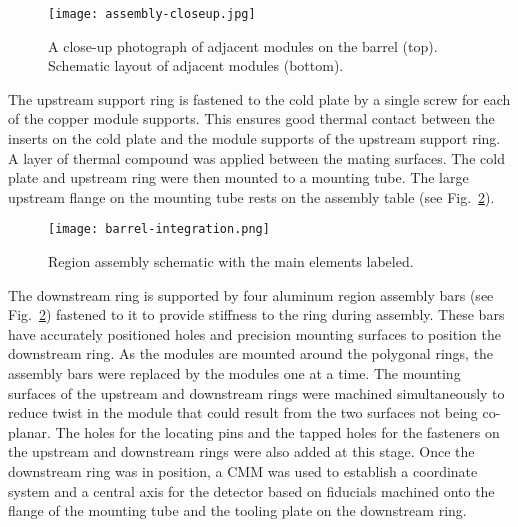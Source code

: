 \begin{figure}[h] 
\centering 
\texttt{[image: assembly-closeup.jpg]}
\caption{A close-up photograph of adjacent modules on the barrel (top). Schematic layout of adjacent modules
  (bottom).}
\label{fig:assembly-closeup}
\end{figure}

The upstream support ring is fastened to the cold plate by a single screw for each of the copper module supports.
This ensures good thermal contact between the inserts on the cold plate and the module supports of the upstream
support ring. A layer of thermal compound was applied between the mating surfaces. The cold plate and upstream
ring were then mounted to a mounting tube. The large upstream flange on the mounting tube rests on the assembly
table (see Fig.~\ref{fig:barrel-integration}). 

\begin{figure}[h] 
\centering 
\texttt{[image: barrel-integration.png]}
\caption{Region assembly schematic with the main elements labeled.}
\label{fig:barrel-integration}
\end{figure}

The downstream ring is supported by four aluminum region assembly bars (see Fig.~\ref{fig:barrel-integration})
fastened to it to provide stiffness to the ring during assembly. These bars have accurately positioned holes and
precision mounting surfaces to position the downstream ring. As the modules are mounted around the polygonal
rings, the assembly bars were replaced by the modules one at a time. The mounting surfaces of the upstream and
downstream rings were machined simultaneously to reduce twist in the module that could result from the two
surfaces not being co-planar. The holes for the locating pins and the tapped holes for the fasteners on the upstream
and downstream rings were also added at this stage. Once the downstream ring was in position, a CMM was used to
establish a coordinate system and a central axis for the detector based on fiducials machined onto the flange of
the mounting tube and the tooling plate on the downstream ring.


